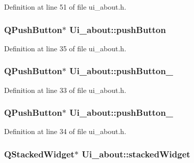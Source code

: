 Definition at line 51 of file ui\_\-about.h.

\hypertarget{classUi__about_a8880d015410b512f4e5768d161b24fb9}{
\subsubsection[{pushButton}]{\setlength{\rightskip}{0pt plus 5cm}QPushButton$\ast$ {\bf Ui\_\-about::pushButton}}}
\label{classUi__about_a8880d015410b512f4e5768d161b24fb9}


Definition at line 35 of file ui\_\-about.h.

\hypertarget{classUi__about_abeef62c6750cebb3c0f0912ae74409a5}{
\subsubsection[{pushButton\_\-2}]{\setlength{\rightskip}{0pt plus 5cm}QPushButton$\ast$ {\bf Ui\_\-about::pushButton\_}}}
\label{classUi__about_abeef62c6750cebb3c0f0912ae74409a5}


Definition at line 33 of file ui\_\-about.h.

\hypertarget{classUi__about_a9dedeaa7b70ac20bcd4912ddcdf0ec64}{
\subsubsection[{pushButton\_\-3}]{\setlength{\rightskip}{0pt plus 5cm}QPushButton$\ast$ {\bf Ui\_\-about::pushButton\_}}}
\label{classUi__about_a9dedeaa7b70ac20bcd4912ddcdf0ec64}


Definition at line 34 of file ui\_\-about.h.

\hypertarget{classUi__about_ae47ab43139893b6e08dba3cb781dcd4f}{
\subsubsection[{stackedWidget}]{\setlength{\rightskip}{0pt plus 5cm}QStackedWidget$\ast$ {\bf Ui\_\-about::stackedWidget}}}
\label{classUi__about_ae47ab43139893b6e08dba3cb781dcd4f}


